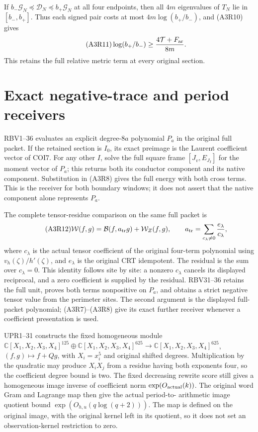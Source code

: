 \documentclass[11pt]{article}
\begin{document}
If $b_-\mathscr G_N\preceq\mathscr D_N\preceq b_+\mathscr G_N$
at all four endpoints, then all $4m$ eigenvalues of $T_N$ lie in
$[b_-,b_+]$. Thus each signed pair costs at most
$4m\log(b_+/b_-)$, and (A3R10) gives
\begin{equation}\tag{A3R11}
 \log(b_+/b_-)\ge\frac{4\mathcal T+F_{\rm ar}}{8m}.
\end{equation}
This retains the full relative metric term at every original section.

\section{Exact negative-trace and period receivers}
RBV1--36 evaluates an explicit degree-$8a$ polynomial $P_a$ in the
original full packet. If the retained section is $I_0$, its exact preimage
is the Laurent coefficient vector of COI7. For any other $I$,
solve the full square frame $[J_v,E_{J_I}]$ for the moment vector of $P_a$;
this returns both its conductor component and its native component.
Substitution in (A3R8) gives the full energy with both cross terms.
This is the receiver for both boundary windows; it does not assert that
the native component alone represents $P_a$.

The complete tensor-residue comparison on the same full packet is
\begin{equation}\tag{A3R12}
 \mathcal W(f,g)=\mathcal B(f,a_{\rm tr}g)+\mathcal W_Z(f,g),
 \qquad a_{\rm tr}=\sum_{c_\lambda\ne0}\frac{e_\lambda}{c_\lambda},
\end{equation}
where $c_\lambda$ is the actual tensor coefficient of the original
four-term polynomial using $v_h(\zeta)/h'(\zeta)$, and $e_\lambda$ is the
original CRT idempotent. The residual is the sum over $c_\lambda=0$.
This identity follows site by site: a nonzero $c_\lambda$ cancels its
displayed reciprocal, and a zero coefficient is supplied by the residual.
RBV31--36 retains the full unit, proves both terms nonpositive on $P_a$,
and obtains a strict negative tensor value from the perimeter sites.
The second argument is the displayed full-packet polynomial; (A3R7)--(A3R8)
give its exact further receiver whenever a coefficient presentation is used.

UPR1--31 constructs the fixed homogeneous module
$\mathbb C[X_1,X_2,X_3,X_4]^{125}\oplus
\mathbb C[X_1,X_2,X_3,X_4]^{625}\to
\mathbb C[X_1,X_2,X_3,X_4]^{625}$, $(f,g)\mapsto f+Qg$,
with $X_i=x_i^5$ and original shifted degrees.
Multiplication by the quadratic may produce $X_iX_j$ from a residue
having both exponents four, so the coefficient degree bound is two.
The fixed decreasing rewrite score still gives a homogeneous image inverse
of coefficient norm $\exp(O_{\rm actual}(k))$.
The original word Gram and Lagrange map then give the actual period-to-
arithmetic image quotient bound $\exp(O_{h,u}(q\log(q+2)))$.
The map is defined on the original image, with the original kernel left
in its quotient, so it does not set an observation-kernel restriction to zero.
\end{document}
